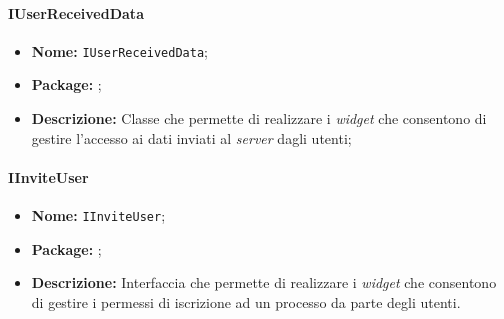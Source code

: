 \paragraph{IUserReceivedData}
\begin{itemize}
\item \textbf{Nome:} \texttt{IUserReceivedData};
\item \textbf{Package:} \texttt{\iViewAdmin{}};
\item \textbf{Descrizione:} Classe che permette di realizzare i \textit{widget} che consentono di gestire l'accesso ai dati inviati al \textit{server} dagli utenti;
\end{itemize}

\paragraph{IInviteUser}
\begin{itemize}
\item \textbf{Nome:} \texttt{IInviteUser};
\item \textbf{Package:} \texttt{\iViewAdmin{}};
\item \textbf{Descrizione:} Interfaccia che permette di realizzare i \textit{widget} che consentono di gestire i permessi di iscrizione ad un processo da parte degli utenti.
\end{itemize}